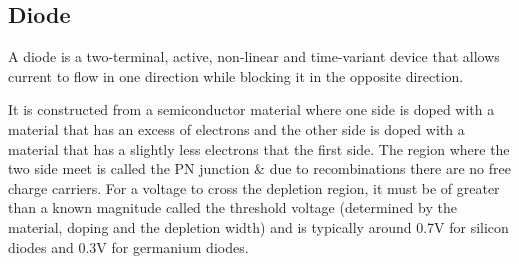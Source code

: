 \subsection{Diode}

A diode is a two-terminal, active, non-linear and time-variant
device that allows current to flow in one direction while blocking
it in the opposite direction.

It is constructed from a semiconductor material where one side is doped
with a material that has an excess of electrons and the other side
is doped with a material that has a slightly less electrons that
the first side. The region where the two side meet is called the
PN junction \& due to recombinations there are no free charge
carriers. For a voltage to cross the depletion region, it must be
of greater than a known magnitude called the threshold voltage
(determined by the material, doping and the depletion width) and
is typically around 0.7V for silicon diodes and 0.3V for germanium
diodes.


